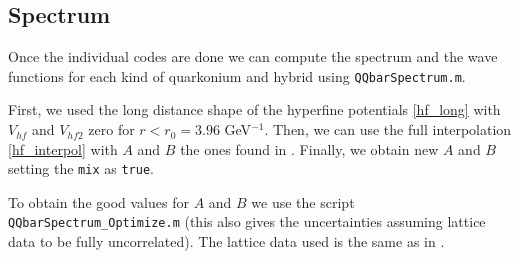 \documentclass[11pt, a4paper]{article}
\begin{document}
\subsection{Spectrum}
Once the individual codes are done we can compute the spectrum and the wave functions for each kind of quarkonium and hybrid using \texttt{QQbarSpectrum.m}.

First, we used the long distance shape of the hyperfine potentials \eqref{hf_long} with $V_{hf}$ and $V_{hf2}$ zero for $r<r_0=3.96$ GeV$^{-1}$. Then, we can use the full interpolation \eqref{hf_interpol} with $A$ and $B$ the ones found in \cite{Soto:2023lbh}.
Finally, we obtain new $A$ and $B$ setting the \texttt{mix} as \texttt{true}. 

To obtain the good values for $A$ and $B$ we use the script \texttt{QQbarSpectrum\_Optimize.m} (this also gives the uncertainties assuming lattice data to be fully uncorrelated). The lattice data used is the same as in \cite{Soto:2023lbh}.
\end{document}
